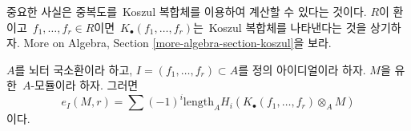 \noindent
중요한 사실은 중복도를\  Koszul 복합체를 이용하여 계산할 수 있다는 것이다.
$R$이 환이고\  $f_1, \ldots, f_r \in R$이면\ 
$K_\bullet(f_1, \ldots, f_r)$는\  Koszul 복합체를 나타낸다는 것을 상기하자.
More on Algebra, Section \ref{more-algebra-section-koszul}을 보라.

\begin{theorem}
\label{theorem-multiplicity-with-koszul}
\begin{reference}
\cite[Theorem 1 in part B of Chapter IV]{Serre_algebre_locale}
\end{reference}
$A$를 뇌터 국소환이라 하고, $I = (f_1, \ldots, f_r) \subset A$를 정의
아이디얼이라 하자. $M$을 유한\  $A$-모듈이라 하자. 그러면
$$
e_I(M, r) = \sum
(-1)^i\text{length}_A H_i(K_\bullet(f_1, \ldots, f_r) \otimes_A M)
$$
이다.
\end{theorem}

